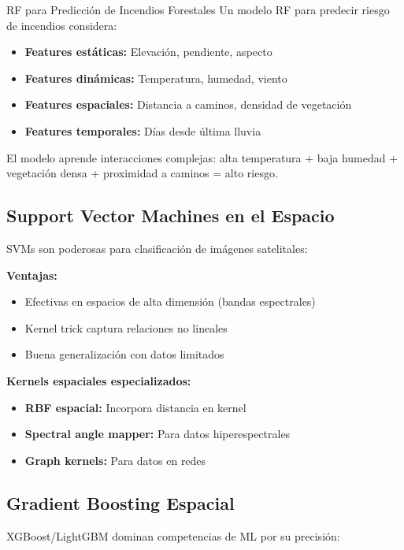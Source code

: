 \documentclass[12pt,a4paper]{article}
\begin{document}
\begin{ejemplo}{RF para Predicción de Incendios Forestales}
Un modelo RF para predecir riesgo de incendios considera:
\begin{itemize}
    \item \textbf{Features estáticas:} Elevación, pendiente, aspecto
    \item \textbf{Features dinámicas:} Temperatura, humedad, viento
    \item \textbf{Features espaciales:} Distancia a caminos, densidad de vegetación
    \item \textbf{Features temporales:} Días desde última lluvia
\end{itemize}

El modelo aprende interacciones complejas: alta temperatura + baja humedad + vegetación densa + proximidad a caminos = alto riesgo.
\end{ejemplo}

\subsection{Support Vector Machines en el Espacio}

SVMs son poderosas para clasificación de imágenes satelitales:

\textbf{Ventajas:}
\begin{itemize}
    \item Efectivas en espacios de alta dimensión (bandas espectrales)
    \item Kernel trick captura relaciones no lineales
    \item Buena generalización con datos limitados
\end{itemize}

\textbf{Kernels espaciales especializados:}
\begin{itemize}
    \item \textbf{RBF espacial:} Incorpora distancia en kernel
    \item \textbf{Spectral angle mapper:} Para datos hiperespectrales
    \item \textbf{Graph kernels:} Para datos en redes
\end{itemize}

\subsection{Gradient Boosting Espacial}

XGBoost/LightGBM dominan competencias de ML por su precisión:
\end{document}
